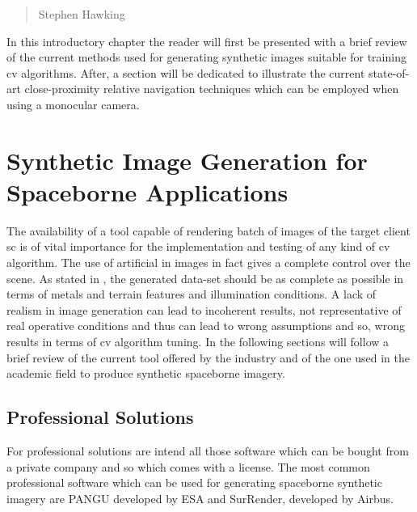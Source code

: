 \begin{quotation}
  {\footnotesize
    \begin{flushright}
      Stephen Hawking
    \end{flushright}
  }
\end{quotation}
\vspace{0.5cm}

In this introductory chapter the reader will first be presented with a brief review of the current methods used for generating synthetic images suitable for training \acrshort{cv} algorithms. After, a section will be dedicated to illustrate the current state-of-art close-proximity relative navigation techniques which can be employed when using a monocular camera.

\section{Synthetic Image Generation for Spaceborne Applications}
The availability of a tool capable of rendering batch of images of the target client \acrshort{sc} is of vital importance for the implementation and testing of any kind of \acrshort{cv} algorithm. The use of artificial in images in fact gives a complete control over the scene. As stated in \cite{paolocorti}, the generated data-set should be as complete as possible in terms of metals and terrain features and illumination conditions. A lack of realism in image generation can lead to incoherent results, not representative of real operative conditions and thus can lead to wrong assumptions and so, wrong results in terms of \acrshort{cv} algorithm tuning. In the following sections will follow a brief review of the current tool offered by the industry and of the one used in the academic field to produce synthetic spaceborne imagery.

\subsection{Professional Solutions}
For professional solutions are intend all those software which can be bought from a private company and so which comes with a license. The most common professional software which can be used for generating spaceborne synthetic imagery are PANGU developed by ESA and SurRender, developed by Airbus.

